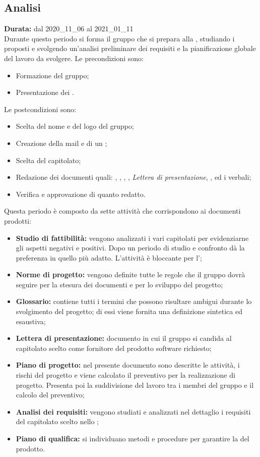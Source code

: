 \subsection{Analisi}
\label{analisi}
\textbf{Durata:} dal 2020\_11\_06 al 2021\_01\_11\\
Durante questo periodo si forma il gruppo che si prepara alla , studiando i  proposti e svolgendo un'analisi preliminare dei requisiti e la pianificazione globale del lavoro da svolgere. 
Le precondizioni sono:
\begin{itemize}
    \item Formazione del gruppo;
    \item Presentazione dei .
\end{itemize}
Le postcondizioni sono:
\begin{itemize}
    \item Scelta del nome e del logo del gruppo;
    \item Creazione della mail e di un  ;
    \item Scelta del capitolato;
    \item Redazione dei documenti quali: {\SdF}, {\NdP}, {\PdP}, {\Glossario}, \textit{Lettera di presentazione}, {\PdQ}, {\AdR} ed i verbali;
    \item Verifica e approvazione di quanto redatto.
\end{itemize}
Questa periodo è composto da sette attività che corrispondono ai documenti prodotti:
\begin{itemize}
    \item \textbf{Studio di fattibilità:} vengono analizzati i vari capitolati per evidenziarne gli aspetti negativi e positivi. Dopo un periodo di studio e confronto {\Gruppo} dà la preferenza in quello più adatto. L'attività è bloccante per l'{\AdR};
    \item \textbf{Norme di progetto:} vengono definite tutte le regole che il gruppo {\Gruppo} dovrà seguire per la stesura dei documenti e per lo sviluppo del progetto;
    \item \textbf{Glossario:} contiene tutti i termini che possono risultare ambigui durante lo svolgimento del progetto; di essi viene fornita una definizione sintetica ed esaustiva;
    \item \textbf{Lettera di presentazione:} documento in cui il gruppo {\Gruppo} si candida al capitolato scelto come fornitore del prodotto software richiesto;
    \item \textbf{Piano di progetto:} nel presente documento sono descritte le attività, i rischi del progetto e viene calcolato il preventivo per la realizzazione di progetto. Presenta poi la suddivisione del lavoro tra i membri del gruppo {\Gruppo} e il calcolo del preventivo;
    \item \textbf{Analisi dei requisiti:} vengono studiati e analizzati nel dettaglio i requisiti del capitolato scelto nello {\SdF};
    \item \textbf{Piano di qualifica:} si individuano metodi e procedure per garantire la  del prodotto.
\end{itemize}
